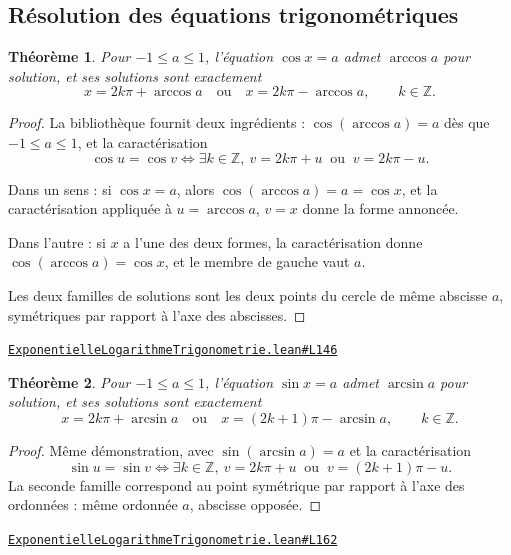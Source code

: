 \documentclass[11pt,a4paper]{article}
\theoremstyle{definition}
\theoremstyle{plain}
\newtheorem{theoreme}{Théorème}
\newcommand{\source}[2]{\par\smallskip\noindent\hfill{\footnotesize\href{#1}{\texttt{#2}}}\par\smallskip}
\begin{document}
\subsection{Résolution des équations trigonométriques}

\begin{theoreme}
Pour $-1 \le a \le 1$, l'équation $\cos x = a$ admet $\arccos a$ pour solution, et ses
solutions sont exactement
\[ x = 2k\pi + \arccos a \quad \text{ou} \quad x = 2k\pi - \arccos a,
   \qquad k \in \mathbb{Z} . \]
\end{theoreme}

\begin{proof}
La bibliothèque fournit deux ingrédients : $\cos(\arccos a) = a$ dès que
$-1 \le a \le 1$, et la caractérisation
\[ \cos u = \cos v \iff \exists k \in \mathbb{Z},\
   v = 2k\pi + u \ \text{ ou } \ v = 2k\pi - u . \]

Dans un sens : si $\cos x = a$, alors $\cos(\arccos a) = a = \cos x$, et la
caractérisation appliquée à $u = \arccos a$, $v = x$ donne la forme annoncée.

Dans l'autre : si $x$ a l'une des deux formes, la caractérisation donne
$\cos(\arccos a) = \cos x$, et le membre de gauche vaut $a$.

\medskip\noindent
Les deux familles de solutions sont les deux points du cercle de même abscisse $a$,
symétriques par rapport à l'axe des abscisses.
\end{proof}
\source{https://github.com/Commutator-IO/learn-lean/blob/main/cours/02-lycee/05-exponentielle-logarithme-trigonometrie/ExponentielleLogarithmeTrigonometrie.lean\#L146}{ExponentielleLogarithmeTrigonometrie.lean\#L146}

\begin{theoreme}
Pour $-1 \le a \le 1$, l'équation $\sin x = a$ admet $\arcsin a$ pour solution, et ses
solutions sont exactement
\[ x = 2k\pi + \arcsin a \quad \text{ou} \quad x = (2k+1)\pi - \arcsin a,
   \qquad k \in \mathbb{Z} . \]
\end{theoreme}

\begin{proof}
Même démonstration, avec $\sin(\arcsin a) = a$ et la caractérisation
\[ \sin u = \sin v \iff \exists k \in \mathbb{Z},\
   v = 2k\pi + u \ \text{ ou } \ v = (2k+1)\pi - u . \]
La seconde famille correspond au point symétrique par rapport à l'axe des ordonnées : même
ordonnée $a$, abscisse opposée.
\end{proof}
\source{https://github.com/Commutator-IO/learn-lean/blob/main/cours/02-lycee/05-exponentielle-logarithme-trigonometrie/ExponentielleLogarithmeTrigonometrie.lean\#L162}{ExponentielleLogarithmeTrigonometrie.lean\#L162}
\end{document}
